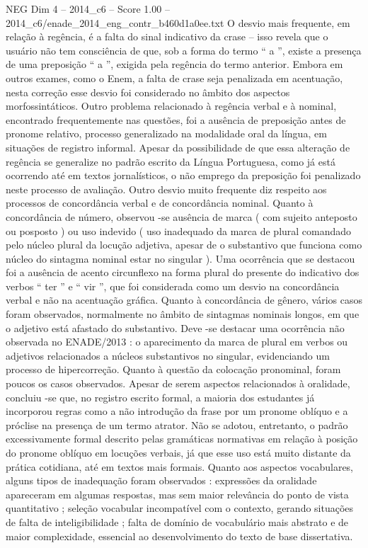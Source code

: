 \begin{textsample}{NEG Dim 4 – 2014\_c6 – Score 1.00 – 2014\_c6/enade\_2014\_eng\_contr\_b460d1a0ee.txt}
O desvio mais frequente, em relação à regência, é a falta do sinal indicativo da crase – isso revela que o usuário não tem consciência de que, sob a forma do termo “ a ”, existe a presença de uma preposição “ a ”, exigida pela regência do termo anterior.
Embora em outros exames, como o Enem, a falta de crase seja penalizada em acentuação, nesta correção esse desvio foi considerado no âmbito dos aspectos morfossintáticos.
Outro problema relacionado à regência verbal e à nominal, encontrado frequentemente nas questões, foi a ausência de preposição antes de pronome relativo, processo generalizado na modalidade oral da língua, em situações de registro informal.
Apesar da possibilidade de que essa alteração de regência se generalize no padrão escrito da Língua Portuguesa, como já está ocorrendo até em textos jornalísticos, o não emprego da preposição foi penalizado neste processo de avaliação.
Outro desvio muito frequente diz respeito aos processos de concordância verbal e de concordância nominal.
Quanto à concordância de número, observou -se ausência de marca ( com sujeito anteposto ou posposto ) ou uso indevido ( uso inadequado da marca de plural comandado pelo núcleo plural da locução adjetiva, apesar de o substantivo que funciona como núcleo do sintagma nominal estar no singular ).
Uma ocorrência que se destacou foi a ausência de acento circunflexo na forma plural do presente do indicativo dos verbos “ ter ” e “ vir ”, que foi considerada como um desvio na concordância verbal e não na acentuação gráfica.
Quanto à concordância de gênero, vários casos foram observados, normalmente no âmbito de sintagmas nominais longos, em que o adjetivo está afastado do substantivo.
Deve -se destacar uma ocorrência não observada no ENADE/2013 : o aparecimento da marca de plural em verbos ou adjetivos relacionados a núcleos substantivos no singular, evidenciando um processo de hipercorreção.
Quanto à questão da colocação pronominal, foram poucos os casos observados.
Apesar de serem aspectos relacionados à oralidade, concluiu -se que, no registro escrito formal, a maioria dos estudantes já incorporou regras como a não introdução da frase por um pronome oblíquo e a próclise na presença de um termo atrator.
Não se adotou, entretanto, o padrão excessivamente formal descrito pelas gramáticas normativas em relação à posição do pronome oblíquo em locuções verbais, já que esse uso está muito distante da prática cotidiana, até em textos mais formais.
Quanto aos aspectos vocabulares, alguns tipos de inadequação foram observados : expressões da oralidade apareceram em algumas respostas, mas sem maior relevância do ponto de vista quantitativo ; seleção vocabular incompatível com o contexto, gerando situações de falta de inteligibilidade ; falta de domínio de vocabulário mais abstrato e de maior complexidade, essencial ao desenvolvimento do texto de base dissertativa.

\end{textsample}
